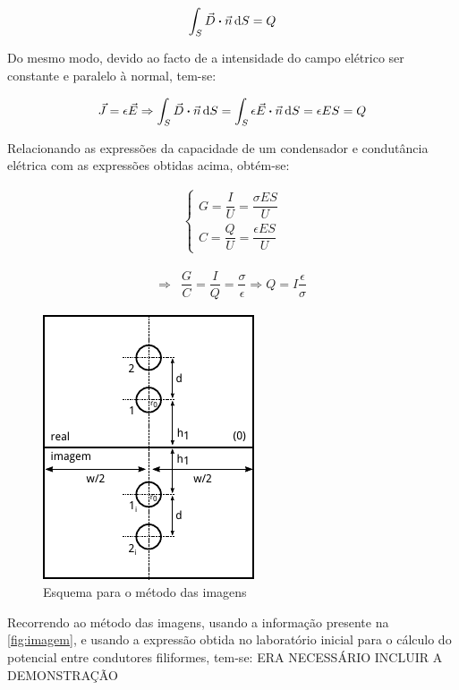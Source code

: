 \documentclass[11pt, a4paper, titlepage, portuguese]{article}
\begin{document}
	\begin{align*}
			\int_S \vec{D} \vdot \vec{n} \dd{S} = Q
	\end{align*}

	\par
	Do mesmo modo, devido ao facto de a intensidade do campo elétrico ser constante e paralelo à normal, tem-se:

	\begin{align*}
		\vec{J} = \epsilon \vec{E} \Rightarrow \int_S \vec{D} \vdot \vec{n} \dd{S} = \int_S \epsilon \vec{E} \vdot \vec{n} \dd{S} = \epsilon E S = Q
	\end{align*}

	\par
	Relacionando as expressões da capacidade de um condensador e condutância elétrica com as expressões obtidas acima, obtém-se:

	\begin{align*}
		\begin{cases}
			G = \dfrac{I}{U} = \dfrac{\sigma E S}{U} \\[1em]
    	C = \dfrac{Q}{U} = \dfrac{\epsilon E S}{U}
 		\end{cases}
	\end{align*}

	\begin{align*}
		\Rightarrow &\dfrac{G}{C} = \dfrac{I}{Q} = \dfrac{\sigma}{\epsilon} \Rightarrow Q = I\dfrac{\epsilon}{\sigma}
	\end{align*}

	\begin{figure}[H]
		\centering
		\includegraphics[width=0.4\linewidth]{imagem.pdf}
		\caption{Esquema para o método das imagens}
		\label{fig:imagem}
	\end{figure}

	Recorrendo ao método das imagens, usando a informação presente na \autoref{fig:imagem}, e usando a expressão obtida no laboratório inicial para o cálculo do potencial entre condutores filiformes, tem-se: ERA NECESSÁRIO INCLUIR A DEMONSTRAÇÃO
\end{document}
